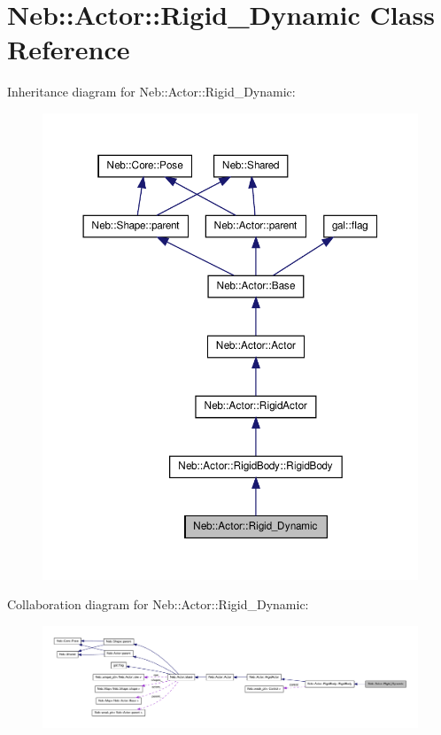 \hypertarget{classNeb_1_1Actor_1_1Rigid__Dynamic}{\section{\-Neb\-:\-:\-Actor\-:\-:\-Rigid\-\_\-\-Dynamic \-Class \-Reference}
\label{classNeb_1_1Actor_1_1Rigid__Dynamic}
}


\-Inheritance diagram for \-Neb\-:\-:\-Actor\-:\-:\-Rigid\-\_\-\-Dynamic\-:
\nopagebreak
\begin{figure}[H]
\begin{center}
\leavevmode
\includegraphics[width=350pt]{classNeb_1_1Actor_1_1Rigid__Dynamic__inherit__graph}
\end{center}
\end{figure}


\-Collaboration diagram for \-Neb\-:\-:\-Actor\-:\-:\-Rigid\-\_\-\-Dynamic\-:
\nopagebreak
\begin{figure}[H]
\begin{center}
\leavevmode
\includegraphics[width=350pt]{classNeb_1_1Actor_1_1Rigid__Dynamic__coll__graph}
\end{center}
\end{figure}
